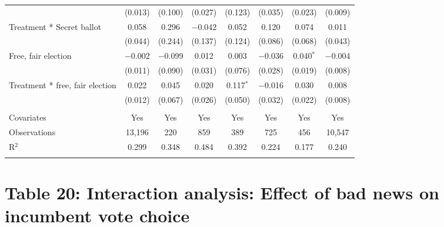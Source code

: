 \documentclass[]{article}
\begin{document}
\begin{table}[!htbp]
\begin{tabular}{@{\extracolsep{1pt}}lccccccc}
  & (0.013) & (0.100) & (0.027) & (0.123) & (0.035) & (0.023) & (0.009) \\ 
  Treatment * Secret ballot & 0.058 & 0.296 & $-$0.042 & 0.052 & 0.120 & 0.074 & 0.011 \\ 
  & (0.044) & (0.244) & (0.137) & (0.124) & (0.086) & (0.068) & (0.043) \\ 
  Free, fair election & $-$0.002 & $-$0.099 & 0.012 & 0.003 & $-$0.036 & 0.040$^{*}$ & $-$0.004 \\ 
  & (0.011) & (0.090) & (0.031) & (0.076) & (0.028) & (0.019) & (0.008) \\ 
  Treatment * free, fair election & 0.022 & 0.045 & 0.020 & 0.117$^{*}$ & $-$0.016 & 0.030 & 0.008 \\ 
  & (0.012) & (0.067) & (0.026) & (0.050) & (0.032) & (0.022) & (0.008) \\ 
 \hline \\[-1.8ex] 
Covariates & Yes & Yes & Yes & Yes & Yes & Yes & Yes \\ 
Observations & 13,196 & 220 & 859 & 389 & 725 & 456 & 10,547 \\ 
R$^{2}$ & 0.299 & 0.348 & 0.484 & 0.392 & 0.224 & 0.177 & 0.240 \\ 
\hline 
\hline \\[-1.8ex] 
\end{tabular} 
\end{table}

\clearpage

\section{Table 20: Interaction analysis: Effect of bad news on incumbent
vote
choice}\label{table-20-interaction-analysis-effect-of-bad-news-on-incumbent-vote-choice}
\end{document}
